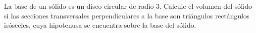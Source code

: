 \item La base de un sólido es un disco circular de radio 3. Calcule el volumen del sólido si las secciones transversales perpendiculares a la base son triángulos rectángulos isósceles, cuya hipotenusa se encuentra sobre la base del sólido.
